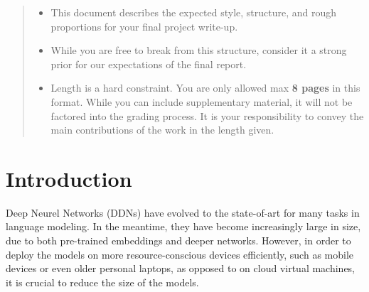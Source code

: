 \documentclass[10pt]{article}
\begin{document}

\begin{abstract}
  \begin{itemize}
  \item This document describes the expected style, structure, and rough proportions for your final project write-up.
  \item While you are free to break from this structure, consider it a strong prior for our expectations of the final report.
\item Length is a hard constraint. You are only allowed max \textbf{8 pages} in this format. While you can include supplementary material, it will not be factored into the grading process. It is your responsibility to convey the main contributions of the work in the length given.
  \end{itemize}



\end{abstract}

\section{Introduction}
\label{sec:introduction}


Deep Neurel Networks (DDNs) have evolved to the state-of-art for many tasks in
language modeling. In the meantime, they have become increasingly large in
size, due to both pre-trained embeddings and deeper networks. However, in
order to deploy the models on more resource-conscious devices efficiently,
such as mobile devices or even older personal laptops, as opposed to on cloud
virtual machines, it is crucial to reduce the size of the models.
\end{document}
